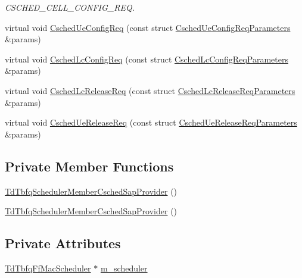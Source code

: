 \begin{DoxyCompactItemize}
\begin{DoxyCompactList}\small\item\em C\+S\+C\+H\+E\+D\+\_\+\+C\+E\+L\+L\+\_\+\+C\+O\+N\+F\+I\+G\+\_\+\+R\+EQ. \end{DoxyCompactList}\item 
virtual void \hyperlink{classns3_1_1TdTbfqSchedulerMemberCschedSapProvider_a52eea1e1fbfa3c4194e03d5fdcd22145}{Csched\+Ue\+Config\+Req} (const struct \hyperlink{structns3_1_1FfMacCschedSapProvider_1_1CschedUeConfigReqParameters}{Csched\+Ue\+Config\+Req\+Parameters} \&params)
\item 
virtual void \hyperlink{classns3_1_1TdTbfqSchedulerMemberCschedSapProvider_a67d1623fd9e6cf9451f7b2912d7f8d2b}{Csched\+Lc\+Config\+Req} (const struct \hyperlink{structns3_1_1FfMacCschedSapProvider_1_1CschedLcConfigReqParameters}{Csched\+Lc\+Config\+Req\+Parameters} \&params)
\item 
virtual void \hyperlink{classns3_1_1TdTbfqSchedulerMemberCschedSapProvider_ab9ea51db7ac67eb1454a433ed0e1e410}{Csched\+Lc\+Release\+Req} (const struct \hyperlink{structns3_1_1FfMacCschedSapProvider_1_1CschedLcReleaseReqParameters}{Csched\+Lc\+Release\+Req\+Parameters} \&params)
\item 
virtual void \hyperlink{classns3_1_1TdTbfqSchedulerMemberCschedSapProvider_a5e2ec279b9327a71d451f419d9c5c295}{Csched\+Ue\+Release\+Req} (const struct \hyperlink{structns3_1_1FfMacCschedSapProvider_1_1CschedUeReleaseReqParameters}{Csched\+Ue\+Release\+Req\+Parameters} \&params)
\end{DoxyCompactItemize}
\subsection*{Private Member Functions}
\begin{DoxyCompactItemize}
\item 
\hyperlink{classns3_1_1TdTbfqSchedulerMemberCschedSapProvider_a277e603aa2cf398c894e41ae6633b31a}{Td\+Tbfq\+Scheduler\+Member\+Csched\+Sap\+Provider} ()
\item 
\hyperlink{classns3_1_1TdTbfqSchedulerMemberCschedSapProvider_a277e603aa2cf398c894e41ae6633b31a}{Td\+Tbfq\+Scheduler\+Member\+Csched\+Sap\+Provider} ()
\end{DoxyCompactItemize}
\subsection*{Private Attributes}
\begin{DoxyCompactItemize}
\item 
\hyperlink{classns3_1_1TdTbfqFfMacScheduler}{Td\+Tbfq\+Ff\+Mac\+Scheduler} $\ast$ \hyperlink{classns3_1_1TdTbfqSchedulerMemberCschedSapProvider_a259efac8dce5665e5e528d1624661a97}{m\+\_\+scheduler}
\end{DoxyCompactItemize}


